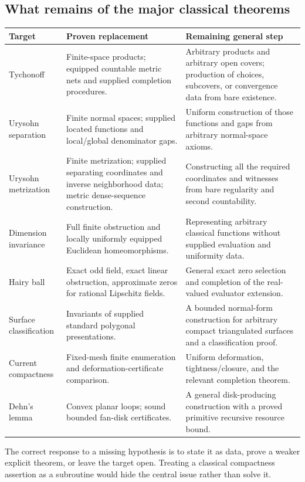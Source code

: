 \subsection{What remains of the major classical theorems}

\begin{longtable}{P{.22\textwidth}P{.32\textwidth}P{.37\textwidth}}
\toprule
Target & Proven replacement & Remaining general step\\
\midrule
\endhead
Tychonoff &
Finite-space products; equipped countable metric nets and supplied completion procedures. &
Arbitrary products and arbitrary open covers; production of choices, subcovers, or convergence data from bare existence.\\
Urysohn separation &
Finite normal spaces; supplied located functions and local/global denominator gaps. &
Uniform construction of those functions and gaps from arbitrary normal-space axioms.\\
Urysohn metrization &
Finite metrization; supplied separating coordinates and inverse neighborhood data; metric dense-sequence construction. &
Constructing all the required coordinates and witnesses from bare regularity and second countability.\\
Dimension invariance &
Full finite obstruction and locally uniformly equipped Euclidean homeomorphisms. &
Representing arbitrary classical functions without supplied evaluation and uniformity data.\\
Hairy ball &
Exact odd field, exact linear obstruction, approximate zeros for rational Lipschitz fields. &
General exact zero selection and completion of the real-valued evaluator extension.\\
Surface classification &
Invariants of supplied standard polygonal presentations. &
A bounded normal-form construction for arbitrary compact triangulated surfaces and a classification proof.\\
Current compactness &
Fixed-mesh finite enumeration and deformation-certificate comparison. &
Uniform deformation, tightness/closure, and the relevant completion theorem.\\
Dehn's lemma &
Convex planar loops; sound bounded fan-disk certificates. &
A general disk-producing construction with a proved primitive recursive resource bound.\\
\bottomrule
\end{longtable}

The correct response to a missing hypothesis is to state it as data, prove a weaker explicit theorem, or leave the target open. Treating a classical compactness assertion as a subroutine would hide the central issue rather than solve it.

